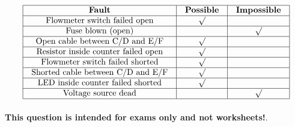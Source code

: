 






$$\vbox{\offinterlineskip
\halign{\strut
\vrule \quad\hfil # \ \hfil & 
\vrule \quad\hfil # \ \hfil & 
\vrule \quad\hfil # \ \hfil \vrule \cr
\noalign{\hrule}
%
{\bf Fault} & {\bf Possible} & {\bf Impossible} \cr
%
\noalign{\hrule}
%
Flowmeter switch failed open & $\surd$ &  \cr
%
\noalign{\hrule}
%
Fuse blown (open) &  & $\surd$ \cr
%
\noalign{\hrule}
%
Open cable between C/D and E/F & $\surd$ &  \cr
%
\noalign{\hrule}
%
Resistor inside counter failed open & $\surd$ &  \cr
%
\noalign{\hrule}
%
Flowmeter switch failed shorted & $\surd$ &  \cr
%
\noalign{\hrule}
%
Shorted cable between C/D and E/F & $\surd$ &  \cr
%
\noalign{\hrule}
%
LED inside counter failed shorted & $\surd$ &  \cr
%
\noalign{\hrule}
%
Voltage source dead &  & $\surd$ \cr
%
\noalign{\hrule}
} %
}$$ %








{\bf This question is intended for exams only and not worksheets!}.


